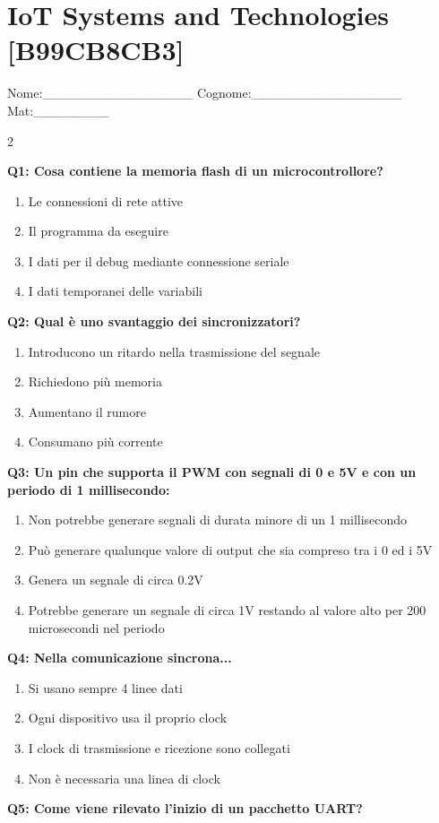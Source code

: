 \documentclass[10pt]{article}
\begin{document}
\newpage

\section*{IoT Systems and Technologies \footnotesize [B99CB8CB3]}
{\footnotesize Nome:\_\_\_\_\_\_\_\_\_\_\_\_\_\_\_\_ Cognome:\_\_\_\_\_\_\_\_\_\_\_\_\_\_\_\_ Mat:\_\_\_\_\_\_\_\_}
\begin{multicols}{2}

\textbf{Q1: Cosa contiene la memoria flash di un microcontrollore?}

\begin{enumerate}[label=\arabic*.]
\item Le connessioni di rete attive
\item Il programma da eseguire
\item I dati per il debug mediante connessione seriale
\item I dati temporanei delle variabili
\end{enumerate}
\textbf{Q2: Qual è uno svantaggio dei sincronizzatori?}

\begin{enumerate}[label=\arabic*.]
\item Introducono un ritardo nella trasmissione del segnale
\item Richiedono più memoria
\item Aumentano il rumore
\item Consumano più corrente
\end{enumerate}
\textbf{Q3: Un pin che supporta il PWM con segnali di 0 e 5V e con un periodo di 1 millisecondo:}

\begin{enumerate}[label=\arabic*.]
\item Non potrebbe generare segnali di durata  minore di un 1 millisecondo
\item Può generare qualunque valore di output che sia compreso tra i 0 ed i 5V
\item Genera un segnale di circa 0.2V
\item Potrebbe generare un segnale di circa 1V restando al valore alto per 200 microsecondi nel periodo
\end{enumerate}
\textbf{Q4: Nella comunicazione sincrona...}

\begin{enumerate}[label=\arabic*.]
\item Si usano sempre 4 linee dati
\item Ogni dispositivo usa il proprio clock
\item I clock di trasmissione e ricezione sono collegati
\item Non è necessaria una linea di clock
\end{enumerate}
\textbf{Q5: Come viene rilevato l’inizio di un pacchetto UART?}


\end{multicols}
\end{document}
